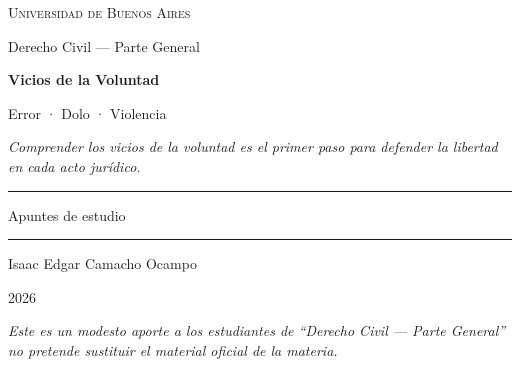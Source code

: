 \documentclass[12pt,oneside]{book}
\newcommand{\universidad}{Universidad de Buenos Aires}
\newcommand{\carrera}{Derecho Civil --- Parte General}
\newcommand{\materia}{Vicios de la Voluntad}
\newcommand{\titulo}{Error · Dolo · Violencia}
\newcommand{\autor}{Isaac Edgar Camacho Ocampo}
\newcommand{\anio}{2026}
\begin{document}
\begin{titlepage}
\thispagestyle{empty}

\begin{center}

\vspace*{1cm}

{\large \textsc{\universidad}}

\vspace{0.6cm}

{\large \carrera}

\vspace{3cm}

{\Huge \textbf{\materia}}

\vspace{1cm}

{\LARGE \titulo}

\vspace{0.8cm}

\textit{Comprender los vicios de la voluntad es el primer paso para defender la libertad en cada acto jurídico.}

\vspace{1.2cm}

\rule{0.70\textwidth}{0.5pt}

\vspace{0.5cm}

{\large Apuntes de estudio}

\vspace{0.5cm}

\rule{0.70\textwidth}{0.5pt}

\vfill

{\large \autor}

\vspace{0.3cm}

{\large \anio}

\end{center}

\vfill

\begin{flushleft}
\textit{Este es un modesto aporte a los estudiantes de ``Derecho Civil --- Parte General'' no pretende sustituir el material oficial de la materia.}
\end{flushleft}

\end{titlepage}

\frontmatter
\tableofcontents
\clearpage
\end{document}
